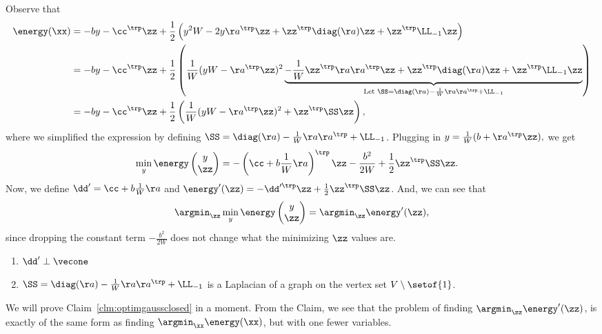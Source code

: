 Observe that
\begin{align*}
  \energy(\xx)
  &=
    - by  -\cc^\trp\zz
    +
    \frac{1}{2}
    \left(
    y^2 W - 2 y \aa^\trp \zz
    +
    \zz^\trp \diag(\aa) \zz
    +
    \zz^\trp \LL_{-1} \zz
    \right)
  \\* %
  &=
  - by  -\cc^\trp\zz
    +
    \frac{1}{2}
    \left(
    \frac{1}{W}( yW - \aa^\trp \zz )^2
    \underbrace{
    -
    \frac{1}{W}\zz^\trp \aa\aa^\trp \zz
    +
    \zz^\trp \diag(\aa) \zz
    +
    \zz^\trp \LL_{-1} \zz
    }_{\text{Let } \SS = \diag(\aa) - \frac{1}{W}\aa\aa^\trp +\LL_{-1}  }
    \right)
  \\* %
  &=
  - by  -\cc^\trp\zz
    +
    \frac{1}{2}
    \left(
    \frac{1}{W}( yW - \aa^\trp \zz )^2
    +
    \zz^\trp\SS \zz
    \right),
\end{align*}
where we simplified the expression by defining $\SS = \diag(\aa) -
\frac{1}{W}\aa\aa^\trp +\LL_{-1}$.
Plugging in ${y = \frac{1}{W}(b + \aa^\trp \zz),}$
we get
\begin{align*}
  \min_{y}
  \energy
  \begin{pmatrix}
  y \\ \zz
\end{pmatrix}
  &=
  -\left(\cc +  b \frac{1}{W}\aa \right)^\trp\zz
    -
    \frac{b^2}{2W}
    +
    \frac{1}{2}
    \zz^\trp\SS \zz
    .
\end{align*}
Now, we define $\dd' = \cc +  b \frac{1}{W}\aa$
and $  \energy'(\zz) =
-\dd'^\trp\zz +
\frac{1}{2}\zz^\trp\SS\zz$.
And, we can see that
\begin{align*}
  \argmin_{\zz} \min_{y}
  \energy
  \begin{pmatrix}
  y \\ \zz
\end{pmatrix}
  =
\argmin_{\zz}
    \energy'(\zz),
\end{align*}
since dropping the constant term $    -
    \frac{b^2}{2W}$ does not change what the minimizing $\zz$ values
    are.
\begin{claim}
\label{clm:optimgaussclosed}
\noindent
  \begin{enumerate}
  \item $ \dd' \perp \vecone$
  \item $ \SS = \diag(\aa) - \frac{1}{W}\aa\aa^\trp +\LL_{-1} $ is a
    Laplacian of a graph on the vertex set $V\setminus\setof{1}$.
  \end{enumerate}
\end{claim}
We will prove Claim~\ref{clm:optimgaussclosed} in a moment.
From the Claim, we see that the problem of finding $\argmin_{\zz}
    \energy'(\zz)$, is exactly of the same form as finding $\argmin_{\xx}
    \energy(\xx)$, but with one fewer variables.


